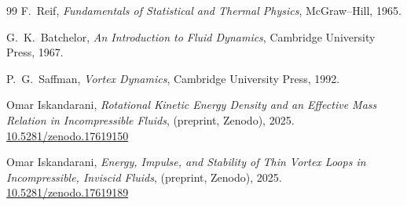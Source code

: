 \documentclass[11pt]{article}
\begin{document}
\begin{thebibliography}{99}
            F.~Reif,
            \newblock \emph{Fundamentals of Statistical and Thermal Physics},
            \newblock McGraw--Hill, 1965.

            G.~K.~Batchelor,
            \newblock \emph{An Introduction to Fluid Dynamics},
            \newblock Cambridge University Press, 1967.

            P.~G.~Saffman,
            \newblock \emph{Vortex Dynamics},
            \newblock Cambridge University Press, 1992.

            Omar Iskandarani,
            \newblock \emph{Rotational Kinetic Energy Density and an Effective Mass Relation in Incompressible Fluids},
            \newblock (preprint, Zenodo), 2025.
            \newblock \href{https://doi.org/10.5281/zenodo.17619150}{10.5281/zenodo.17619150}

            Omar Iskandarani,
            \newblock \emph{Energy, Impulse, and Stability of Thin Vortex Loops in Incompressible, Inviscid Fluids},
            \newblock (preprint, Zenodo), 2025.
            \newblock \href{https://doi.org/10.5281/zenodo.17619189}{10.5281/zenodo.17619189}

        \end{thebibliography}
\end{document}
